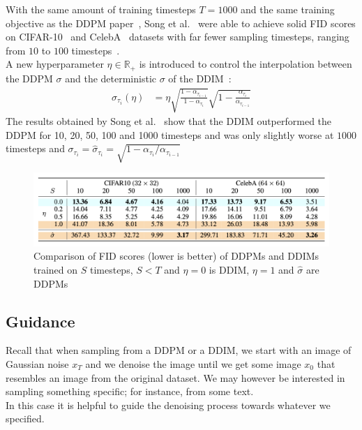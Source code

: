 \documentclass[twoside]{article}
\numberwithin{equation}{section}
\numberwithin{figure}{section}
\begin{document}
With the same amount of training timesteps $T = 1000$ and the same training objective as the DDPM paper~\cite{ho2020denoising}, Song et al.~\cite{song2022denoising} were able to achieve solid FID scores on CIFAR-10~\cite{cifar10} and CelebA~\cite{liu2015faceattributes} datasets with far fewer sampling timesteps, ranging from $10$ to $100$ timesteps~\cite{song2022denoising}. \\
A new hyperparameter $\eta \in \mathbb{R}_+$ is introduced to control the interpolation between the DDPM $\sigma$ and the deterministic $\sigma$ of the DDIM~\cite{song2022denoising}:
\begin{align}
  \sigma_{\tau_i} (\eta) &= \eta \sqrt{\frac{1 - \alpha_{\tau_{i-1}}}{1 - \alpha_{\tau_i}}} \sqrt{1 - \frac{\alpha_{\tau_i}}{\alpha_{\tau_{i-1}}}}
\end{align}
The results obtained by Song et al.~\cite{song2022denoising} show that the DDIM outperformed the DDPM for 10, 20, 50, 100 and 1000 timesteps and was only slightly worse at $1000$ timesteps and $\sigma_{\tau_i} = \hat{\sigma}_{\tau_i} = \sqrt{1 - \alpha_{\tau_i} / \alpha_{\tau_{i-1}}}$

\begin{figure}[h]
  \begin{center}
    \includegraphics[width=\textwidth]{images/ddim_table.png}
    \caption{Comparison of FID scores (lower is better) of DDPMs and DDIMs trained on $S$ timesteps, $S < T$ and $\eta = 0$ is DDIM, $\eta = 1$ and $\hat{\sigma}$ are DDPMs \cite{song2022denoising}}
  \end{center}
\end{figure}



\subsection{Guidance}
Recall that when sampling from a DDPM or a DDIM, we start with an image of Gaussian noise $x_T$ and we denoise the image until we get some image $x_0$ that resembles an image from the original dataset. We may however be interested in sampling something specific; for instance, from some text. \\
In this case it is helpful to guide the denoising process towards whatever we specified.
\end{document}
